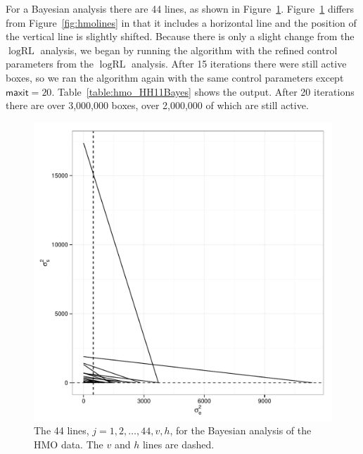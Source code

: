 \documentclass{report}
\newcommand{\textcompute}{\textsf}
\newcommand{\RLorig}{\text{RL}}
\newcommand{\logRLorig}{\log\RLorig}
\newcommand{\maxit}{\textcompute{maxit}}
\begin{document}
For a Bayesian analysis there are 44 lines, as shown in Figure~\ref{fig:hmoBayeslines}.  Figure~\ref{fig:hmoBayeslines} differs from Figure~\ref{fig:hmolines} in that it includes a horizontal line and the position of the vertical line is slightly shifted.  Because there is only a slight change from the $\logRLorig$ analysis, we began by running the algorithm with the refined control parameters from the $\logRLorig$ analysis.  After 15 iterations there were still active boxes, so we ran the algorithm again with the same control parameters except $\maxit=20$.  Table~\ref{table:hmo_HH11Bayes} shows the output.  After 20 iterations there are over 3,000,000 boxes, over 2,000,000 of which are still active.
\begin{figure}
	\centering
	\includegraphics[width=.45\linewidth]{figs/hmolines_HH11_Bayes.pdf}
	\caption{The 44 lines, $j=1, 2, \dots, 44, v, h$, for the Bayesian analysis of the HMO data.
	              The $v$ and $h$ lines are dashed.}
	\label{fig:hmoBayeslines}
\end{figure}
\end{document}
